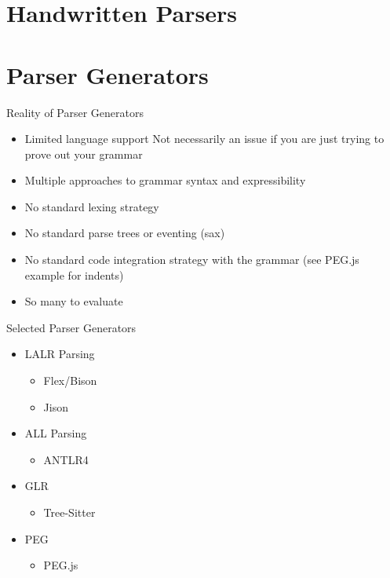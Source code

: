 \documentclass{book}
\begin{document}
\section{Handwritten Parsers}

\section{Parser Generators}
Reality of Parser Generators
\begin{itemize}
    \item 
    Limited language support
        Not necessarily an issue if you are just trying to prove out your grammar
    \item 
    Multiple approaches to grammar syntax and expressibility
    \item 
    No standard lexing strategy
    \item 
    No standard parse trees or eventing (sax)
    \item 
    No standard code integration strategy with the grammar (see PEG.js example for indents)
    \item 
    So many to evaluate
\end{itemize}

Selected Parser Generators
\begin{itemize}
    \item LALR Parsing
    \begin{itemize}
        \item Flex/Bison
        \item Jison
    \end{itemize}
    \item ALL Parsing
    \begin{itemize}
        \item ANTLR4
    \end{itemize}
    \item GLR
    \begin{itemize}
        \item Tree-Sitter
    \end{itemize}
    \item PEG
    \begin{itemize}
        \item PEG.js
    \end{itemize}
\end{itemize}




%
%
\end{document}
